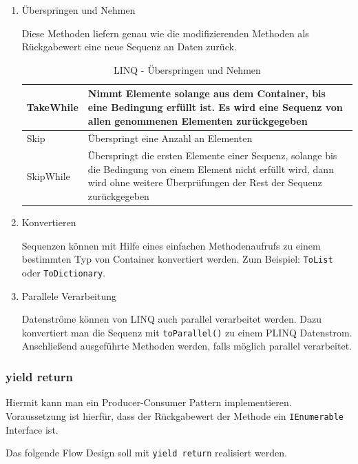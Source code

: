 \begin{enumerate}
\item Überspringen und Nehmen

Diese Methoden liefern genau wie die modifizierenden Methoden als Rückgabewert
eine neue Sequenz an Daten zurück.

\bigskip
\begin{table}[H]
	\centering
\begin{tabularx}{\textwidth}{|p{130pt}|X|}
	\hline
TakeWhile & Nimmt Elemente solange aus dem Container, bis eine Bedingung erfüllt ist. Es wird eine Sequenz von allen genommenen Elementen zurückgegeben\\	\hline
Skip & Überspringt eine Anzahl an Elementen\\	\hline
SkipWhile & Überspringt die ersten Elemente einer Sequenz, solange bis die Bedingung von einem Element nicht erfüllt wird, dann wird ohne weitere Überprüfungen der Rest der Sequenz zurückgegeben\\	\hline
\end{tabularx}
	\medskip
	\caption{LINQ - Überspringen und Nehmen}
	
\end{table}

\item Konvertieren

Sequenzen können mit Hilfe eines einfachen Methodenaufrufs zu einem bestimmten Typ
von Container konvertiert werden. Zum Beispiel: \texttt{ToList} oder \texttt{ToDictionary}.

\item Parallele Verarbeitung

Datenströme können von LINQ auch parallel verarbeitet werden. Dazu konvertiert
man die Sequenz mit \texttt{toParallel()} zu einem PLINQ Datenstrom.
Anschließend ausgeführte Methoden werden, falls möglich parallel verarbeitet.

\end{enumerate}


\subsubsection{yield return}

Hiermit kann man ein Producer-Consumer Pattern implementieren.
Voraussetzung ist hierfür, dass der Rückgabewert der Methode ein \texttt{IEnumerable} Interface ist.

Das folgende Flow Design soll mit \texttt{yield return} realisiert werden.

